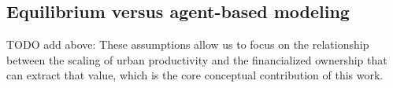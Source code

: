 {%




\subsection{Equilibrium versus agent-based modeling}

TODO add above: These assumptions allow us to focus on the relationship between the scaling of urban productivity and the financialized ownership that can extract that value, which is  the core conceptual contribution of this work. 




}
